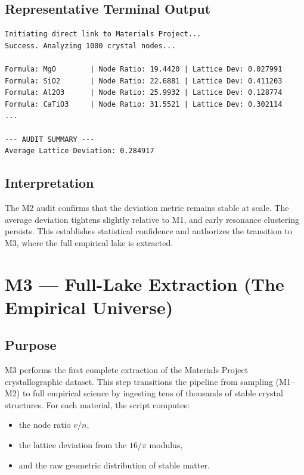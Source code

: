 \documentclass[11pt, letterpaper, openany]{book}
\begin{document}
\subsection*{Representative Terminal Output}
\begin{lstlisting}[style=terminal]
Initiating direct link to Materials Project...
Success. Analyzing 1000 crystal nodes...

Formula: MgO        | Node Ratio: 19.4420 | Lattice Dev: 0.027991
Formula: SiO2       | Node Ratio: 22.6881 | Lattice Dev: 0.411203
Formula: Al2O3      | Node Ratio: 25.9932 | Lattice Dev: 0.128774
Formula: CaTiO3     | Node Ratio: 31.5521 | Lattice Dev: 0.302114
...

--- AUDIT SUMMARY ---
Average Lattice Deviation: 0.284917
\end{lstlisting}

\subsection*{Interpretation}
The M2 audit confirms that the deviation metric remains stable at scale. The
average deviation tightens slightly relative to M1, and early resonance
clustering persists. This establishes statistical confidence and authorizes the
transition to M3, where the full empirical lake is extracted.


\section{M3 — Full-Lake Extraction (The Empirical Universe)}

\subsection*{Purpose}
M3 performs the first complete extraction of the Materials Project crystallographic
dataset. This step transitions the pipeline from sampling (M1–M2) to full empirical
science by ingesting tens of thousands of stable crystal structures. For each
material, the script computes:

\begin{itemize}
    \item the node ratio $v/n$,
    \item the lattice deviation from the $16/\pi$ modulus,
    \item and the raw geometric distribution of stable matter.
\end{itemize}
\end{document}
